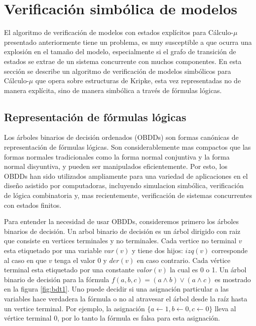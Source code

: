 \chapter{Verificación simbólica de modelos}

El algoritmo de verificación de modelos con estados explícitos para Cálculo-$\mu$ presentado anteriormente tiene un problema, es muy susceptible a que ocurra una explosión en el tamaño del modelo, especialmente si el grafo de transición de estados se extrae de un sistema concurrente con muchos componentes. En esta sección se describe un algoritmo de verificación de modelos simbólicos para Cálculo-$\mu$ que opera sobre estructuras de Kripke, esta vez representadas no de manera explícita, sino de manera simbólica a través de fórmulas lógicas.

\section{Representación de fórmulas lógicas}

Los árboles binarios de decisión ordenados (OBDDs) son formas canónicas de representación de fórmulas lógicas. Son considerablemente mas compactos que las formas normales tradicionales como la forma normal conjuntiva y la forma normal disyuntiva, y pueden ser manipulados eficientemente. Por esto, los OBDDs han sido utilizados ampliamente para una variedad de aplicaciones en el diseño asistido por computadoras, incluyendo simulacion simbólica, verificación de lógica combinatoria y, mas recientemente, verificación de sistemas concurrentes con estados finitos.

Para entender la necesidad de usar OBDDs, consideremos primero los árboles binarios de decisión. Un arbol binario de decisión es un árbol dirigido con raiz que consiste en vertices terminales y no terminales. Cada vertice no terminal $v$ esta etiquetado por una variable $var(v)$ y tiene dos hijos: $izq(v)$ corresponde al caso en que $v$ tenga el valor 0 y $der(v)$ en caso contrario. Cada vértice terminal esta etiquetado por una constante $valor(v)$ la cual es 0 o 1. Un árbol binario de decisión para la fórmula $f(a,b,c) = (a \land b) \lor (a \land c)$ es mostrado en la figura \ref{fig:bdt1}. Uno puede decidir si una asignación particular a las variables hace verdadera la fórmula o no al atravesar el árbol desde la raíz hasta un vertice terminal. Por ejemplo, la asignación $\{ a \gets 1, b \gets 0, c \gets 0\}$ lleva al vértice terminal 0, por lo tanto la fórmula es falsa para esta asignación.

